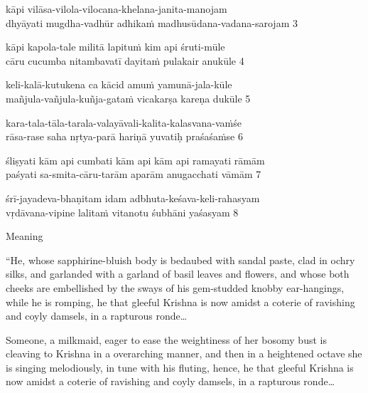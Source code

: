 \begin{myquote}
kāpi vilāsa-vilola-vilocana-khelana-janita-manojam \\ dhyāyati mugdha-vadhūr adhikaṁ madhusūdana-vadana-sarojam  3 
\end{myquote}

\begin{myquote}
kāpi kapola-tale militā lapituṁ kim api śruti-mūle  \\ cāru cucumba nitambavatī dayitaṁ pulakair anukūle  4 
\end{myquote}

\begin{myquote}
keli-kalā-kutukena ca kācid amuṁ yamunā-jala-kūle  \\ mañjula-vañjula-kuñja-gataṁ vicakarṣa kareṇa dukūle  5 
\end{myquote}

\begin{myquote}
kara-tala-tāla-tarala-valayāvali-kalita-kalasvana-vaṁśe  \\ rāsa-rase saha nṛtya-parā hariṇā yuvatiḥ praśaśaṁse  6 
\end{myquote}

\begin{myquote}
śliṣyati kām api cumbati kām api kām api ramayati rāmām  \\ paśyati sa-smita-cāru-tarām aparām anugacchati vāmām  7 
\end{myquote}

\begin{myquote}
śrī-jayadeva-bhaṇitam idam adbhuta-keśava-keli-rahasyam  \\ vṛdāvana-vipine lalitaṁ vitanotu śubhāni yaśasyam  8 
\end{myquote}

Meaning

\begin{myquote}
“He, whose sapphirine-bluish body is bedaubed with sandal paste, clad in ochry silks, and garlanded with a garland of basil leaves and flowers, and whose both cheeks are embellished by the sways of his gem-studded knobby ear-hangings, while he is romping, he that gleeful Krishna is now amidst a coterie of ravishing and coyly damsels, in a rapturous ronde…
\end{myquote}

\newpage

\begin{myquote}
Someone, a milkmaid, eager to ease the weightiness of her bosomy bust is cleaving to Krishna in a overarching manner, and then in a heightened octave she is singing melodiously, in tune with his fluting, hence, he that gleeful Krishna is now amidst a coterie of ravishing and coyly damsels, in a rapturous ronde…
\end{myquote}

